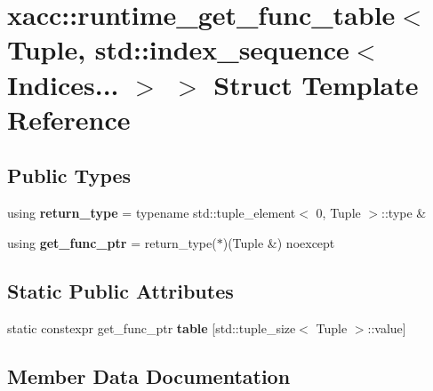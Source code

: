 \hypertarget{a00059}{}\section{xacc\+:\+:runtime\+\_\+get\+\_\+func\+\_\+table$<$ Tuple, std\+:\+:index\+\_\+sequence$<$ Indices... $>$ $>$ Struct Template Reference}
\label{a00059}
\subsection*{Public Types}
\begin{DoxyCompactItemize}
\item 
using {\bfseries return\+\_\+type} = typename std\+::tuple\+\_\+element$<$ 0, Tuple $>$\+::type \&\hypertarget{a00059_a1d2e9cd7910527e3c4f0162500f067a7}{}\label{a00059_a1d2e9cd7910527e3c4f0162500f067a7}

\item 
using {\bfseries get\+\_\+func\+\_\+ptr} = return\+\_\+type($\ast$)(Tuple \&) noexcept\hypertarget{a00059_afba5cf89694dc07b12aaabf6388a4427}{}\label{a00059_afba5cf89694dc07b12aaabf6388a4427}

\end{DoxyCompactItemize}
\subsection*{Static Public Attributes}
\begin{DoxyCompactItemize}
\item 
static constexpr get\+\_\+func\+\_\+ptr {\bfseries table} \mbox{[}std\+::tuple\+\_\+size$<$ Tuple $>$\+::value\mbox{]}
\end{DoxyCompactItemize}


\subsection{Member Data Documentation}
